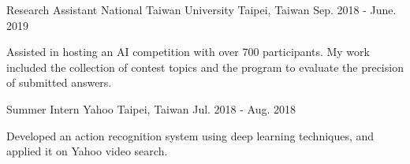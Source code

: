 \begin{cventries}
  \cventry
    {Research Assistant} %
    {National Taiwan University} %
    {Taipei, Taiwan} %
    {Sep. 2018 - June. 2019} %
    {
      \begin{cvitems} %
        \item {Assisted in hosting an AI competition with over 700 participants. My work included the collection of contest topics and the program to evaluate the precision of submitted answers.}
      \end{cvitems}
    }

  \cventry
    {Summer Intern} %
    {Yahoo} %
    {Taipei, Taiwan} %
    {Jul. 2018 - Aug. 2018} %
    {
      \begin{cvitems} %
        \item {Developed an action recognition system using deep learning techniques, and applied it on Yahoo video search.}
      \end{cvitems}
    }

\end{cventries}
